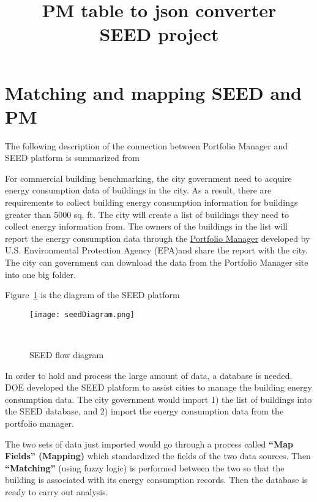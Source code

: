 \documentclass[12pt]{article}
\newcommand{\fref}[1]{Figure~\ref{#1}}
\begin{document}
\title{PM table to json converter\\
       \large SEED project}
\maketitle
\tableofcontents
\newpage
\section{Matching and mapping SEED and PM}\label{sec:map}

  The following description of the connection between Portfolio
  Manager and SEED platform is summarized from ~\cite{SEEDTutorial2015}

  For commercial building benchmarking, the city government need to
  acquire energy consumption data of buildings in the city. As a
  result, there are requirements to collect building energy
  consumption information for buildings greater than 5000 sq. ft. The
  city will create a list of buildings they need to collect energy
  information from. The owners of the buildings in the list will
  report the energy consumption data through the
  \href{https://portfoliomanager.energystar.gov/pm/home.html}{Portfolio
    Manager} developed by U.S. Environmental Protection Agency
  (EPA)and share the report with the city. The city can government can
  download the data from the Portfolio Manager site into one big
  folder. 
  
  \fref{fig:seedDiagram} is the diagram of the SEED platform
  \begin{figure}[h!]
    \centering
    \texttt{[image: seedDiagram.png]}
    \caption{SEED flow diagram}~\cite{SEEDTutorial2015}
    \label{fig:seedDiagram}
  \end{figure}

  In order to hold and process the large amount of data, a database is
  needed. DOE developed the SEED platform to assist cities to manage
  the building energy consumption data. The city government would
  import 1) the list of buildings into the SEED database, and 2)
  import the energy consumption data from the portfolio manager. 

  The two sets of data just imported would go through a process called
  \textbf{``Map Fields'' (Mapping)} which standardized the fields of
  the two data sources. Then \textbf{``Matching''} (using fuzzy logic)
  is performed between the two so that the building is associated with
  its energy consumption records. Then the database is ready to carry
  out analysis.
  
\end{document}
